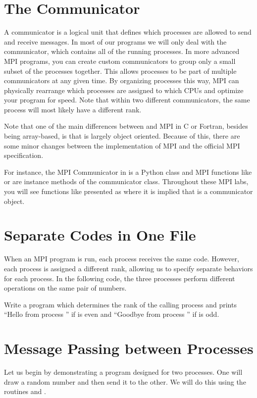 \section*{The Communicator}
A communicator is a logical unit that defines which processes are allowed to send and receive messages.
In most of our programs we will only deal with the  communicator, which contains all of the running processes.
In more advanced MPI programs, you can create custom communicators to group only a small subset of the processes together.
This allows processes to be part of multiple communicators at any given time.
By organizing processes this way, MPI can physically rearrange which processes are assigned to which CPUs and optimize your program for speed.
Note that within two different communicators, the same process will most likely have a different rank.

Note that one of the main differences between  and MPI in C or Fortran, besides being array-based, is that  is largely object oriented.
Because of this, there are some minor changes between the  implementation of MPI and the official MPI specification.

For instance, the MPI Communicator in  is a Python class and MPI functions like  or  are instance methods of the communicator class.
Throughout these MPI labs, you will see functions like  presented as  where it is implied that  is a communicator object.

\section*{Separate Codes in One File}
When an MPI program is run, each process receives the same code.
However, each process is assigned a different rank, allowing us to specify separate behaviors for each process.
In the following code, the three processes perform different operations on the same pair of numbers.


\begin{problem}
Write a program which determines the rank  of the calling process and prints ``Hello from process '' if  is even and ``Goodbye from process '' if  is odd.
\end{problem}

\section*{Message Passing between Processes}
Let us begin by demonstrating a program designed for two processes.
One will draw a random number and then send it to the other.
We will do this using the routines  and .

